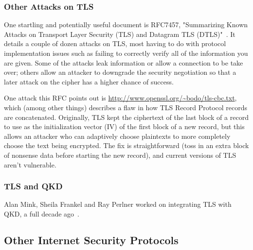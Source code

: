 



\subsubsection{Other Attacks on TLS}

One startling and potentially useful document is RFC7457, "Summarizing
Known Attacks on Transport Layer Security (TLS) and Datagram TLS
(DTLS)"~\cite{RFC7457}.  It details a couple of dozen attacks on TLS, most having to do
with protocol implementation issues such as failing to correctly
verify all of the information you are given.  Some of the attacks leak
information or allow a connection to be take over; others allow an
attacker to downgrade the security negotiation so that a later attack
on the cipher has a higher chance of success.

One attack this RFC points out is
\url{http://www.openssl.org/~bodo/tls-cbc.txt}, which (among other things)
describes a flaw in how TLS Record Protocol records are concatenated.
Originally, TLS kept the ciphertext of the last block of a record to
use as the initialization vector (IV) of the first block of a new
record, but this allows an attacker who can adaptively choose
plaintexts to more completely choose the text being encrypted.  The
fix is straightforward (toss in an extra block of nonsense data before
starting the new record), and current versions of TLS aren't
vulnerable.

\subsubsection{TLS and QKD}

Alan Mink, Sheila Frankel and Ray Perlner worked on integrating TLS
with QKD, a full decade ago~\cite{mink09:_qkd_and_ipsec}.


\subsection{Other Internet Security Protocols}


